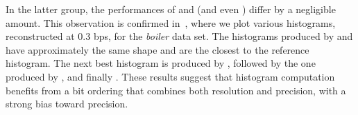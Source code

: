 In the latter group, the performances of \swav and \shsg (and even \shop) differ by a negligible
amount. This observation is confirmed in~, where we plot various
histograms, reconstructed at 0.3 bps, for the \emph{boiler} data set. The histograms produced by
\swav and \shsg have approximately the same shape and are the closest to the reference histogram.
The next best histogram is produced by \slvl, followed by the one produced by \sbit, and finally
\smag. These results suggest that histogram computation benefits from a bit ordering that combines
both resolution and precision, with a strong bias toward precision.
